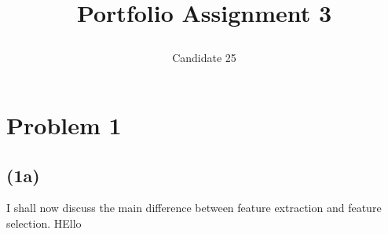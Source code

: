 \documentclass[12pt, letterpaper]{article}
\title{ \begin{huge}
\textbf{Portfolio Assignment 3}
\end{huge} }
\author{Candidate 25}
\date{}
\begin{document}
\maketitle
  \section*{Problem 1}
    \subsection*{(1a)}
        I shall now discuss the main difference between feature extraction and feature selection. HEllo 

\end{document}
